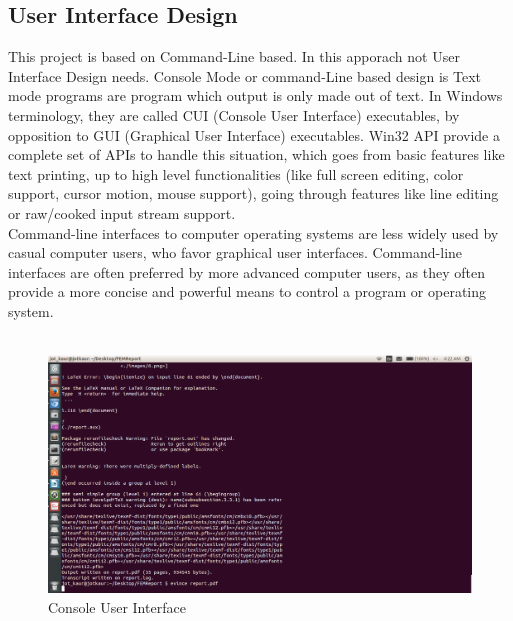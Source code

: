 \subsection{User Interface Design}
This project is based on Command-Line based. In this apporach not User Interface Design needs. Console Mode or command-Line based design is Text mode programs are program which output is only made out of text. In Windows terminology, they are called CUI (Console User Interface) executables, by opposition to GUI (Graphical User Interface) executables. Win32 API provide a complete set of APIs to handle this situation, which goes from basic features like text printing, up to high level functionalities (like full screen editing, color support, cursor motion, mouse support), going through features like line editing or raw/cooked input stream support.\\
Command-line interfaces to computer operating systems are less widely used by casual computer users, who favor graphical user interfaces. Command-line interfaces are often preferred by more advanced computer users, as they often provide a more concise and powerful means to control a program or operating system.\\\\
\begin{figure} [h]
\centering
\includegraphics[scale=0.5]{images/command.png}
\caption{Console User Interface}
\end{figure}
